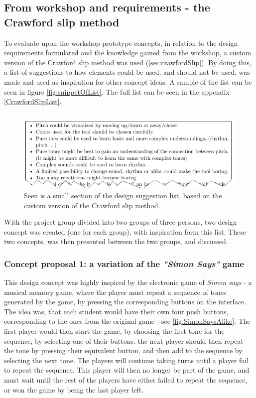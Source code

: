 \subsection{From workshop and requirements - the Crawford slip method}
To evaluate upon the workshop prototype concepts, in relation to the design requirements formulated and the knowledge gained from the workshop, a custom version of the Crawford slip method was used (\autoref{sec:crawfordSlip}). By doing this, a list of suggestions to how elements could be used, and should not be used, was made and used as inspiration for other concept ideas. A sample of the list can be seen in figure \autoref{fig:snippetOfList}. The full list can be seen in the appendix \autoref{CrawfordSlipList}.  

\begin{figure}[H]
	\centering
	\includegraphics[width=0.7\linewidth]{figure/Design/snippetOfList} 
	\caption{Seen is a small section of the design suggestion list, based on the custom version of the Crawford slip method.}
	\label{fig:snippetOfList}
\end{figure}


With the project group divided into two groups of three persons, two design concept was created (one for each group), with inspiration form this list. These two concepts, was then presented between the two groups, and discussed.  

\subsubsection{Concept proposal 1: a variation af the \textit{"Simon Says"} game }
This design concept was highly inspired by the electronic game of \textit{Simon says} \cite{simonSays} - a musical memory game, where the player must repeat a sequence of tones generated by the game, by pressing the corresponding buttons on the interface. The idea was, that each student would have their own four push buttons, corresponding to the ones from the original game - see \autoref{fig:SimonSaysAlike}. The first player would then start the game, by choosing the first tone for the sequence, by selecting one of their buttons. the next player should then repeat the tone by pressing their equivalent button, and then add to the sequence by selecting the next tone. The players will continue taking turns until a player fail to repeat the sequence. This player will then no longer be part of the game, and must wait until the rest of the players have either failed to repeat the sequence, or won the game by being the last player left.

